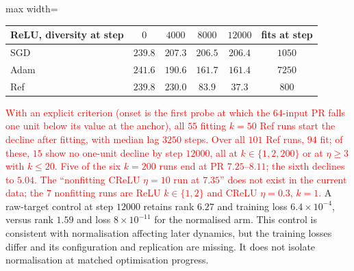 \documentclass{article}
\newcommand{\nat}[1]{\textcolor{red}{#1}}
\theoremstyle{definition}
\theoremstyle{remark}
\begin{document}
\begin{center}\small
\begin{adjustbox}{max width=\linewidth}
\begin{tabular}{lccccc}
\toprule
ReLU, diversity at step & $0$ & $4000$ & $8000$ & $12000$ & fits at step \\
\midrule
SGD & $239.8$ & $207.3$ & $206.5$ & $206.4$ & $1050$ \\
Adam             & $241.6$ & $190.6$ & $161.7$ & $161.4$ & $7250$ \\
Ref        & $239.8$ & $\mathbf{230.0}$ & $83.9$ & $37.3$ & $800$ \\
\bottomrule
\end{tabular}
\end{adjustbox}
\end{center}

\nat{With an explicit criterion (onset is the first probe at which the $64$-input PR falls one unit below its value at the anchor), all $55$ fitting $k=50$ Ref runs start the decline after fitting, with median lag $3250$ steps. Over all $101$ Ref runs, $94$ fit; of these, $15$ show no one-unit decline by step $12000$, all at $k\in\{1,2,200\}$ or at $\eta\ge3$ with $k\le20$. Five of the six $k=200$ runs end at PR $7.25$--$8.11$; the sixth declines to $5.04$. The ``nonfitting CReLU $\eta=10$ run at $7.35$'' does not exist in the current data; the $7$ nonfitting runs are ReLU $k\in\{1,2\}$ and CReLU $\eta=0.3$, $k=1$.} A raw-target control at step $12000$ retains rank $6.27$ and training loss $6.4\times10^{-4}$, versus rank $1.59$ and loss $8\times10^{-11}$ for the normalised arm. This control is consistent with normalisation affecting later dynamics, but the training losses differ and its configuration and replication are missing. It does not isolate normalisation at matched optimisation progress.
\end{document}
